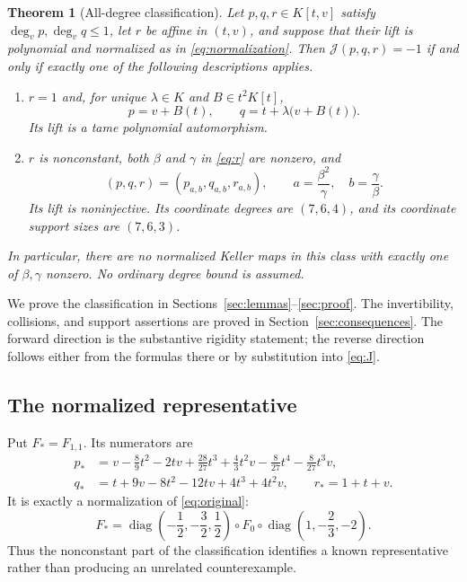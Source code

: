 \documentclass[11pt,a4paper]{article}
\numberwithin{equation}{section}
\newtheorem{theorem}{Theorem}[section]
\theoremstyle{definition}
\theoremstyle{remark}
\newcommand{\J}{\mathcal{J}}
\newcommand{\diag}{\operatorname{diag}}
\begin{document}
\begin{theorem}[All-degree classification]\label{thm:classification}
Let $p,q,r\in K[t,v]$ satisfy $\deg_vp,\deg_vq\le1$, let $r$ be affine in
$(t,v)$, and suppose that their lift is polynomial and normalized as in
\eqref{eq:normalization}. Then $\J(p,q,r)=-1$ if and only if exactly one
of the following descriptions applies.
\begin{enumerate}[label=\textup{(\Alph*)}]
\item\label{case:tame} $r=1$ and, for unique $\lambda\in K$ and
$B\in t^2K[t]$,
\begin{equation}\label{eq:tamepq}
p=v+B(t),\qquad q=t+\lambda\bigl(v+B(t)\bigr).
\end{equation}
Its lift is a tame polynomial automorphism.
\item\label{case:nonconstant} $r$ is nonconstant, both $\beta$ and $\gamma$
in \eqref{eq:r} are nonzero, and
\begin{equation}\label{eq:abrecover}
(p,q,r)=(p_{a,b},q_{a,b},r_{a,b}),\qquad
 a=\frac{\beta^2}{\gamma},\quad b=\frac{\gamma}{\beta}.
\end{equation}
Its lift is noninjective. Its coordinate degrees are $(7,6,4)$, and its
coordinate support sizes are $(7,6,3)$.
\end{enumerate}
In particular, there are no normalized Keller maps in this class with
exactly one of $\beta,\gamma$ nonzero. No ordinary degree bound is assumed.
\end{theorem}

We prove the classification in Sections~\ref{sec:lemmas}--\ref{sec:proof}.
The invertibility, collisions, and support assertions are proved in
Section~\ref{sec:consequences}. The forward direction is the substantive
rigidity statement; the reverse direction follows either from the formulas
there or by substitution into \eqref{eq:J}.

\subsection{The normalized representative}

Put $F_*=F_{1,1}$. Its numerators are
\begin{align*}
p_*&=v-\frac89t^2-2tv+\frac{28}{27}t^3
       +\frac43t^2v-\frac8{27}t^4-\frac8{27}t^3v,\\
q_*&=t+9v-8t^2-12tv+4t^3+4t^2v,\qquad r_*=1+t+v.
\end{align*}
It is exactly a normalization of \eqref{eq:original}:
\begin{equation}\label{eq:originalnormalization}
F_*=\diag\left(-\frac12,-\frac32,\frac12\right)
\circ F_0\circ\diag\left(1,-\frac23,-2\right).
\end{equation}
Thus the nonconstant part of the classification identifies a known
representative rather than producing an unrelated counterexample.
\end{document}

